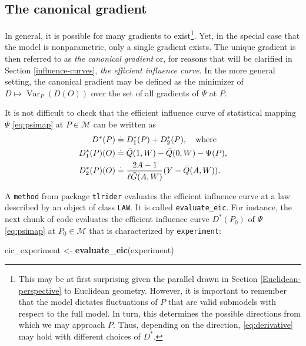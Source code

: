 \documentclass[11pt,openright,twoside]{book}
\newenvironment{Shaded}{\begin{snugshade}}{\end{snugshade}}
\newcommand{\KeywordTok}[1]{\textcolor[rgb]{0.13,0.29,0.53}{\textbf{#1}}}
\newcommand{\NormalTok}[1]{#1}
\newcommand{\StringTok}[1]{\textcolor[rgb]{0.31,0.60,0.02}{#1}}
\DeclareMathOperator{\Var}{Var}
\newcommand{\defq}{\doteq}
\newcommand{\calM}{\mathcal{M}}
\newcommand{\Gbar}{\bar{G}}
\newcommand{\Qbar}{\bar{Q}}
\theoremstyle{definition}
\theoremstyle{definition}
\theoremstyle{definition}
\theoremstyle{remark}
\begin{document}
\hypertarget{canonical-gradient}{%
\subsection{The canonical gradient}\label{canonical-gradient}}

In general, it is possible for many gradients to exist\footnote{This may be at first
  surprising given the parallel drawn in Section \ref{Euclidean-perspective} to
  Euclidean geometry. However, it is important to remember that the model
  dictates fluctuations of \(P\) that are valid submodels with respect to the full
  model. In turn, this determines the possible directions from which we may
  approach \(P\). Thus, depending on the direction, \eqref{eq:derivative} may hold
  with different choices of \(D^*\).}. Yet, in the special case that the model is
nonparametric, only a single gradient exists. The unique gradient is then
referred to as \emph{the canonical gradient} or,
for reasons that will be clarified in Section \ref{influence-curves}, \emph{the efficient influence curve}. In the
more general setting, the canonical gradient may be defined as the minimizer
of \(D\mapsto \Var_{P} (D(O))\) over the set of all gradients of \(\Psi\) at \(P\).

It is not difficult to check that the efficient influence curve of statistical
mapping \(\Psi\) \eqref{eq:psimap} at \(P \in \calM\) can be written as
\begin{align}  D^{*}(P)  &  \defq  D_{1}^{*}   (P)  +  D_{2}^{*}  (P),  \quad
\text{where} \label{eq:eif}\\  D_{1}^{*}(P) (O) &\defq \Qbar(1,W)  - \Qbar(0,W) -
\Psi(P),  \notag\\ D_{2}^{*}(P)  (O)  &\defq \frac{2A-1}{\ell\Gbar(A,W)}(Y  -
\Qbar(A,W)).\notag \end{align}

A \texttt{method} from package \texttt{tlrider} evaluates the efficient influence curve at a
law described by an object of class \texttt{LAW}. It is called \texttt{evaluate\_eic}. For
instance, the next chunk of code evaluates the efficient influence curve
\(D^{*}(P_{0})\) of \(\Psi\) \eqref{eq:psimap} at \(P_{0} \in \calM\) that is
characterized by \texttt{experiment}:

\begin{Shaded}
\begin{Highlighting}[]
\NormalTok{eic_experiment <-}\StringTok{ }\KeywordTok{evaluate_eic}\NormalTok{(experiment)}
\end{Highlighting}
\end{Shaded}
\end{document}
